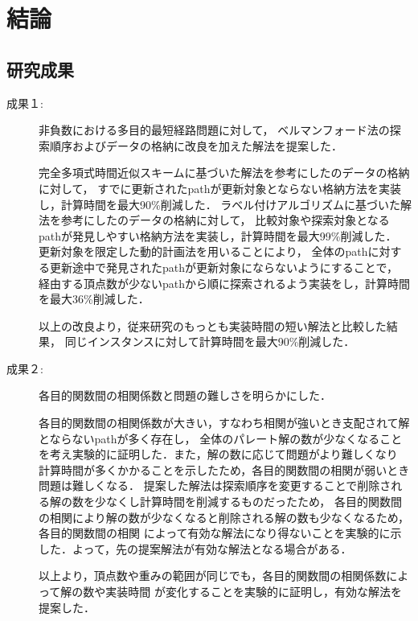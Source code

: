 \documentclass[12pt]{optlab-bachelor}
\begin{document}
\chapter{結論}

\section{研究成果}

\begin{description}
  \item[成果１:]
  非負数における多目的最短経路問題に対して，
  ベルマンフォード法の探索順序およびデータの格納に改良を加えた解法を提案した．

  完全多項式時間近似スキームに基づいた解法を参考にしたのデータの格納に対して，
  すでに更新されたpathが更新対象とならない格納方法を実装し，計算時間を最大90\%削減した．
  ラベル付けアルゴリズムに基づいた解法を参考にしたのデータの格納に対して，
  比較対象や探索対象となるpathが発見しやすい格納方法を実装し，計算時間を最大99\%削減した．
  更新対象を限定した動的計画法を用いることにより，
  全体のpathに対する更新途中で発見されたpathが更新対象にならないようにすることで，
  経由する頂点数が少ないpathから順に探索されるよう実装をし，計算時間を最大36\%削減した．

  以上の改良より，従来研究のもっとも実装時間の短い解法と比較した結果，
  同じインスタンスに対して計算時間を最大90\%削減した．
\end{description}

\begin{description}
  \item[成果２:]
  各目的関数間の相関係数と問題の難しさを明らかにした．

  各目的関数間の相関係数が大きい，すなわち相関が強いとき支配されて解とならないpathが多く存在し，
  全体のパレート解の数が少なくなることを考え実験的に証明した．また，解の数に応じて問題がより難しくなり
  計算時間が多くかかることを示したため，各目的関数間の相関が弱いとき問題は難しくなる．
  提案した解法は探索順序を変更することで削除される解の数を少なくし計算時間を削減するものだったため，
  各目的関数間の相関により解の数が少なくなると削除される解の数も少なくなるため，各目的関数間の相関
  によって有効な解法になり得ないことを実験的に示した．よって，先の提案解法が有効な解法となる場合がある．

  以上より，頂点数や重みの範囲が同じでも，各目的関数間の相関係数によって解の数や実装時間
  が変化することを実験的に証明し，有効な解法を提案した．
\end{description}
\end{document}
